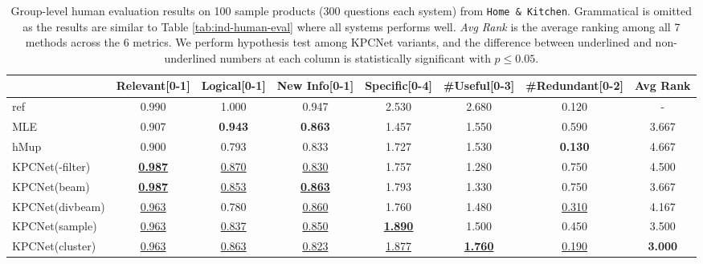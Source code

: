 \documentclass[letterpaper]{article} %
\begin{document}
\begin{table}[htbp]
  \centering
  \small
  \begin{tabular}{l|ccccccc}
    \hline
    {} & Relevant\tiny{[0-1]} & Logical\tiny{[0-1]} & New Info\tiny{[0-1]} & Specific\tiny{[0-4]} & \#Useful\tiny{[0-3]} & \#Redundant\tiny{[0-2]} & Avg Rank \\
    \hline
    ref          &    0.990 &   1.000 &    0.947 &    2.530 &   2.680 &      0.120 & - \\
    \hline
    MLE          &    0.907 &   \textbf{0.943} &    \textbf{0.863} &    1.457 &   1.550 &      0.590 & 3.667 \\
    hMup         &    0.900 &   0.793 &    0.833 &    1.727 &   1.530 &     \textbf{0.130} & 4.667 \\
    \hline
    KPCNet(-filter)  &    \underline{\textbf{0.987}} &   \underline{0.870} &    \underline{0.830} &    1.757 &   1.280 &      0.750 & 4.500 \\
    KPCNet(beam)    &    \underline{\textbf{0.987}} &   \underline{0.853} &    \underline{\textbf{0.863}} &    1.793 &   1.330 &      0.750 & 3.667 \\
    KPCNet(divbeam) &    \underline{0.963} &   0.780 &    \underline{0.860} &    1.760 &   1.480 &  \underline{0.310} & 4.167 \\
    KPCNet(sample)  &    \underline{0.963} &   \underline{0.837} &    \underline{0.850} &    \underline{\textbf{1.890}} &   1.500 &      0.450 & 3.500 \\
    KPCNet(cluster)  &    \underline{0.963} &   \underline{0.863} &    \underline{0.823} &    \underline{1.877} &   \underline{\textbf{1.760}} &      \underline{0.190} & \textbf{3.000} \\
    \hline
    \end{tabular}
  \caption{\label{tab:group-human-eval} Group-level human evaluation results on 100 sample products (300 questions each system) from \texttt{Home \& Kitchen}. Grammatical is omitted as the results are similar to Table \ref{tab:ind-human-eval} where all systems performs well. \textit{Avg Rank} is the average ranking among all 7 methods across the 6 metrics. We perform hypothesis test among KPCNet variants, and the difference between underlined and non-underlined numbers at each column is statistically significant with $p \leq 0.05$.}
  \end{table}
\end{document}
